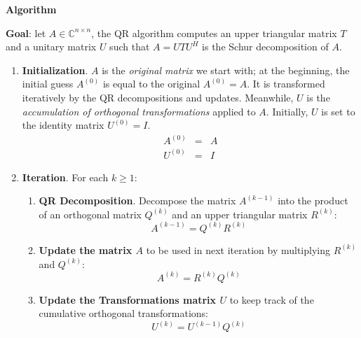 \begin{flushleft}
    \textcolor{Green3}{ \textbf{Algorithm}}
\end{flushleft}
\textbf{Goal}: let $A \in \mathbb{C}^{n \times n}$, the QR algorithm computes an upper triangular matrix $T$ and a unitary matrix $U$ such that $A = UTU^{H}$ is the Schur decomposition of $A$.
\begin{enumerate}
    \item \textbf{Initialization}. $A$ is the \emph{original matrix} we start with; at the beginning, the initial guess $A^{\left(0\right)}$ is equal to the original $A^{\left(0\right)} = A$. It is transformed iteratively by the QR decompositions and updates. Meanwhile, $U$ is the \emph{accumulation of orthogonal transformations} applied to $A$. Initially, $U$ is set to the identity matrix $U^{\left(0\right)} = I$.
    \begin{equation*}
        \begin{array}{rcl}
            A^{\left(0\right)} &=& A \\ [.3em]
            U^{\left(0\right)} &=& I
        \end{array}
    \end{equation*}

    \item \textbf{Iteration}. For each $k \ge 1$:
    \begin{enumerate}
        \item \textbf{QR Decomposition}. Decompose the matrix $A^{\left(k-1\right)}$ into the product of an orthogonal matrix $Q^{\left(k\right)}$ and an upper triangular matrix $R^{\left(k\right)}$:
        \begin{equation*}
            A^{\left(k-1\right)} = Q^{\left(k\right)} R^{\left(k\right)}
        \end{equation*}

        \item \textbf{Update the matrix $A$} to be used in next iteration by multiplying $R^{\left(k\right)}$ and $Q^{\left(k\right)}$:
        \begin{equation*}
            A^{\left(k\right)} = R^{\left(k\right)} Q^{\left(k\right)}
        \end{equation*}

        \item \textbf{Update the Transformations matrix $U$} to keep track of the cumulative orthogonal transformations:
        \begin{equation*}
            U^{\left(k\right)} = U^{\left(k-1\right)} Q^{\left(k\right)}
        \end{equation*}
    \end{enumerate}


\end{enumerate}
